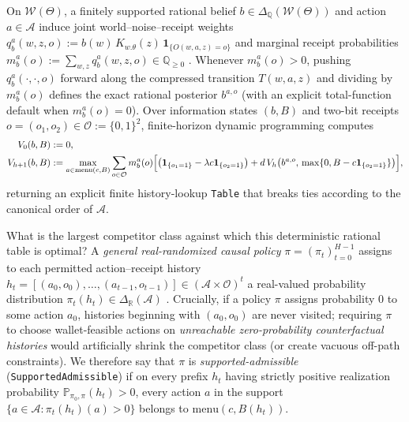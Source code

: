 \documentclass[11pt,letterpaper]{article}
\begin{document}
On \(\mathcal{W}(\Theta)\), a finitely supported rational belief
\(b \in \Delta_{\mathbb{Q}}(\mathcal{W}(\Theta))\) and action
\(a \in \mathcal{A}\) induce joint world--noise--receipt weights
\(q_b^a(w, z, o) := b(w)\, K_{w.\theta}(z)\, \mathbf{1}_{\{O(w,a,z) = o\}}\)
and marginal receipt probabilities
\(m_b^a(o) := \sum_{w,z} q_b^a(w, z, o) \in \mathbb{Q}_{\ge 0}\)
\citep{sondik1978, bertsekas2017}. Whenever \(m_b^a(o) > 0\), pushing
\(q_b^a(\cdot, \cdot, o)\) forward along the compressed transition
\(T(w,a,z)\) and dividing by \(m_b^a(o)\) defines the exact rational
posterior \(b^{a,o}\) (with an explicit total-function default when
\(m_b^a(o) = 0\)). Over information states \((b, B)\) and two-bit
receipts \(o = (o_1, o_2) \in \mathcal{O} := \{0,1\}^2\), finite-horizon
dynamic programming computes \[\begin{aligned}
V_0(b, B) &:= 0, \\
V_{h+1}(b, B) &:= \max_{a \in \mathrm{menu}(c, B)} \sum_{o \in \mathcal{O}} m_b^a(o)\Bigl[\bigl(\mathbf{1}_{\{o_1 = 1\}} - \lambda c \mathbf{1}_{\{o_2 = 1\}}\bigr) + d\, V_h\bigl(b^{a,o},\, \max\{0, B - c\mathbf{1}_{\{o_2 = 1\}}\}\bigr)\Bigr],
\end{aligned}\] returning an explicit finite history-lookup
\texttt{Table} that breaks ties according to the canonical order of
\(\mathcal{A}\).

What is the largest competitor class against which this deterministic
rational table is optimal? A \emph{general real-randomized causal
policy} \(\pi = (\pi_t)_{t=0}^{H-1}\) assigns to each permitted
action--receipt history
\(h_t = [(a_0, o_0), \dots, (a_{t-1}, o_{t-1})] \in (\mathcal{A} \times \mathcal{O})^t\)
a real-valued probability distribution
\(\pi_t(h_t) \in \Delta_{\mathbb{R}}(\mathcal{A})\)
\citep{dynkin1965, blackwell1965, hinderer1970, hernandezLerma1996, kallenberg2021}.
Crucially, if a policy \(\pi\) assigns probability \(0\) to some action
\(a_0\), histories beginning with \((a_0, o_0)\) are never visited;
requiring \(\pi\) to choose wallet-feasible actions on \emph{unreachable
zero-probability counterfactual histories} would artificially shrink the
competitor class (or create vacuous off-path constraints). We therefore
say that \(\pi\) is \emph{supported-admissible}
(\texttt{SupportedAdmissible}) if on every prefix \(h_t\) having
strictly positive realization probability
\(\mathbb{P}_{\pi_0, \pi}(h_t) > 0\), every action \(a\) in the support
\(\{a \in \mathcal{A} : \pi_t(h_t)(a) > 0\}\) belongs to
\(\mathrm{menu}(c, B(h_t))\).
\end{document}
